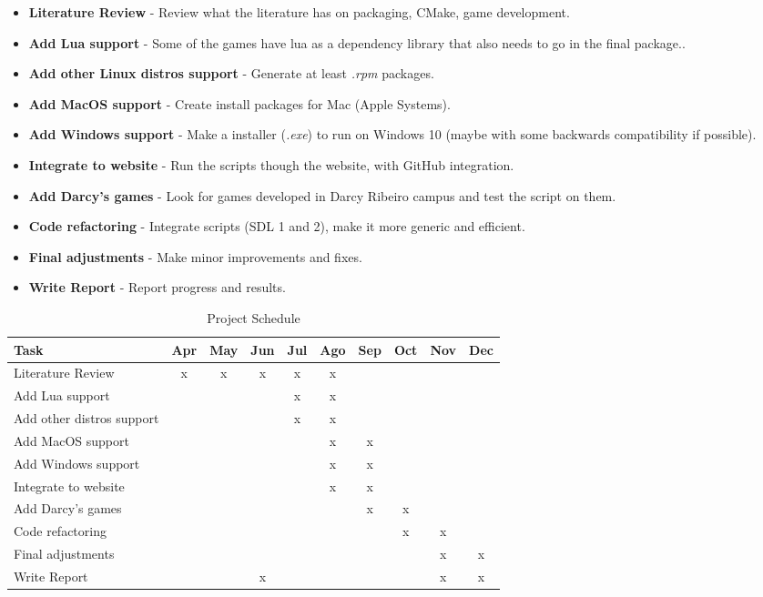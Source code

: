 \begin{itemize}
\item \textbf{Literature Review} - Review what the literature has on packaging, CMake, game development.
\item \textbf{Add Lua support} - Some of the games have lua as a dependency library that also needs to go in the final package..
\item \textbf{Add other Linux distros support} - Generate at least \textit{.rpm} packages.
\item \textbf{Add MacOS support} - Create install packages for Mac (Apple Systems).
\item \textbf{Add Windows support} - Make a installer (\textit{.exe}) to run on Windows 10 (maybe with some backwards compatibility if possible).
\item \textbf{Integrate to website} - Run the scripts though the website, with GitHub integration.
\item \textbf{Add Darcy's games} - Look for games developed in Darcy Ribeiro campus and test the script on them.
\item \textbf{Code refactoring} - Integrate scripts (SDL 1 and 2), make it more generic and efficient.
\item \textbf{Final adjustments} - Make minor improvements and fixes.
\item \textbf{Write Report} - Report progress and results.
\end{itemize}

\begin{table}[h!]
\centering
\caption{Project Schedule}
\label{tab:schedule}
\begin{tabular}{|l|c|c|c|c|c|c|c|c|c|}
\hline
\textbf{Task} & \multicolumn{1}{l|}{\textbf{Apr}} & \multicolumn{1}{l|}{\textbf{May}} & \multicolumn{1}{l|}{\textbf{Jun}} & \multicolumn{1}{l|}{\textbf{Jul}} & \multicolumn{1}{l|}{\textbf{Ago}} & \multicolumn{1}{l|}{\textbf{Sep}} & \multicolumn{1}{l|}{\textbf{Oct}} & \multicolumn{1}{l|}{\textbf{Nov}} & \multicolumn{1}{l|}{\textbf{Dec}} \\ \hline
Literature Review & x & x & x & x & x &  &  &  &  \\ \hline
Add Lua support &  &  &  & x & x &  &  &  &  \\ \hline
Add other distros support &  &  &  & x & x &  &  &  &  \\ \hline
Add MacOS support &  &  &  &  & x & x &  &  &  \\ \hline
Add Windows support &  &  &  &  & x & x &  &  &  \\ \hline
Integrate to website &  &  &  &  & x & x &  &  &  \\ \hline
Add Darcy's games &  &  &  &  &  & x & x &  &  \\ \hline
Code refactoring &  &  &  &  &  &  & x & x &  \\ \hline
Final adjustments &  &  &  &  &  &  &  & x & x \\ \hline
Write Report &  &  & x &  &  &  &  & x & x \\ \hline
\end{tabular}
\end{table}
